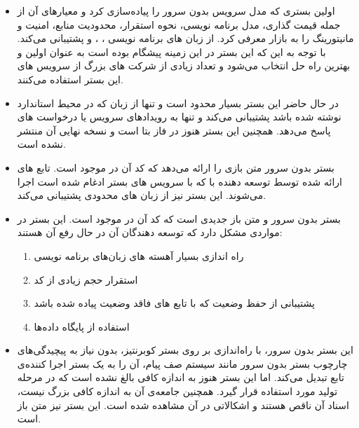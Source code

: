 \begin{itemize}
	
	\item \textbf{}  اولین بستری که مدل سرویس بدون سرور را پیاده‌سازی کرد و معیارهای آن از جمله  قیمت گذاری، مدل برنامه نویسی، نحوه استقرار، محدودیت منابع، امنیت و مانیتورینگ را به بازار معرفی کرد.  از زبان های برنامه نویسی ، ،   و  پشتیبانی می‌کند. با توجه به این که این بستر در این زمینه پیشگام بوده است به عنوان اولین و بهترین راه حل انتخاب می‌شود و تعداد زیادی از شرکت های بزرگ از سرویس های این بستر استفاده می‌کنند.
	
	\item \textbf{}   در حال حاضر این بستر بسیار محدود است و تنها از زبان  که در محیط استاندارد  نوشته شده باشد پشتیبانی می‌کند و تنها به رویدادهای سرویس  یا درخواست های  پاسخ می‌دهد. همچنین این بستر هنوز در فاز بتا است و نسخه نهایی آن منتشر نشده است.
	
	\item \textbf{}  بستر بدون سرور متن بازی را ارائه می‌دهد که کد آن در  موجود است. تابع های ارائه شده توسط توسعه دهنده با  که با سرویس های بستر ادغام شده است اجرا می‌شوند. این بستر نیز از زبان های محدودی پشتیبانی می‌کند.
	
	\item \textbf{}  بستر بدون سرور و متن باز جدیدی است که کد آن در  موجود است. این بستر در مواردی مشکل دارد که توسعه دهندگان آن در حال رفع آن هستند:
	\cite{openlambda}
	
	\begin{enumerate}

		\item راه اندازی بسیار آهسته  های زبان‌های برنامه نویسی
		
		\item استقرار حجم زیادی از کد
		
		\item پشتیبانی از حفظ وضعیت که با تابع های فاقد وضعیت پیاده شده باشد

		\item استفاده از پایگاه داده‌ها

	\end{enumerate}

	\item \textbf{} این بستر بدون سرور، با راه‌اندازی بر روی بستر کوبرنتیز، بدون نیاز به پیچیدگی‌های چارچوب بستر بدون سرور مانند سیستم صف پیام، آن را به یک بستر اجرا کننده‌ی تابع تبدیل می‌کند. اما این بستر هنوز به اندازه کافی بالغ نشده است که در مرحله تولید مورد استفاده قرار گیرد. همچنین جامعه‌ی آن به اندازه کافی بزرگ نیست، اسناد آن ناقص هستند و اشکالاتی در آن مشاهده شده است. این بستر نیز متن باز است.
	\cite{kubeless}
	

\end{itemize}
